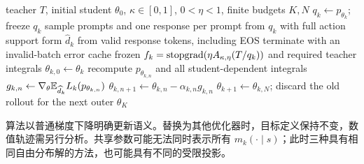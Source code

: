 \begin{algorithm}[ht]
\caption{固定前缀的 MirrorOPD\\{\small\textit{Semantics: 根据条件目标重构；动作期望使用完整词表}}}
\begin{algorithmic}[1]
\Require teacher $T$, initial student $\theta_0$, $\kappa\in[0,1]$, $0<\eta<1$, finite budgets $K,N$
    \State $q_k\gets p_{\theta_k}$; freeze $q_k$
    \State sample prompts and one response per prompt from $q_k$ with full action support
    \State form $\widehat d_k$ from valid response tokens, including EOS
        \State terminate with an invalid-batch error
    \EndIf
    \State cache frozen $f_k=\operatorname{stopgrad}(\eta A_{\kappa,\eta}(T/q_k))$ and required teacher integrals
    \State $\theta_{k,0}\gets\theta_k$
        \State recompute $p_{\theta_{k,n}}$ and all student-dependent integrals
        \State $g_{k,n}\gets\nabla_\theta\mathbb E_{\widehat d_k}L_k(p_{\theta_{k,n}})$
        \State $\theta_{k,n+1}\gets\theta_{k,n}-\alpha_{k,n}g_{k,n}$
    \EndFor
    \State $\theta_{k+1}\gets\theta_{k,N}$; discard the old rollout for the next outer
\EndFor
\State \Return $\theta_K$
\end{algorithmic}
\end{algorithm}

算法以普通梯度下降明确更新语义。替换为其他优化器时，目标定义保持不变，数值轨迹需另行分析。共享参数可能无法同时表示所有 $m_k(\cdot\mid s)$；此时三种具有相同自由分布解的方法，也可能具有不同的受限投影。
